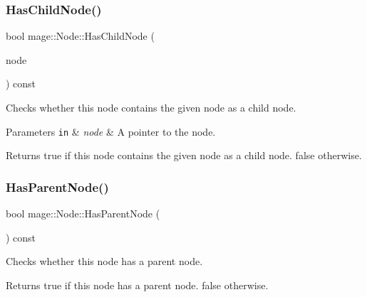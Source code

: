 \subsubsection{\texorpdfstring{Has\+Child\+Node()}{HasChildNode()}}
{\footnotesize\ttfamily bool mage\+::\+Node\+::\+Has\+Child\+Node (\begin{DoxyParamCaption}\item[{\hyperlink{namespacemage_a1e01ae66713838a7a67d30e44c67703e}{Shared\+Ptr}$<$ const \hyperlink{classmage_1_1_node}{Node} $>$}]{node }\end{DoxyParamCaption}) const}

Checks whether this node contains the given node as a child node.


\begin{DoxyParams}[1]{Parameters}
\mbox{\tt in}  & {\em node} & A pointer to the node. \\
\hline
\end{DoxyParams}
\begin{DoxyReturn}{Returns}
{\ttfamily true} if this node contains the given node as a child node. {\ttfamily false} otherwise. 
\end{DoxyReturn}
\hypertarget{classmage_1_1_node_acc47eb0f2eaa60e71fd945e79b4f622d}{}\label{classmage_1_1_node_acc47eb0f2eaa60e71fd945e79b4f622d} 
\subsubsection{\texorpdfstring{Has\+Parent\+Node()}{HasParentNode()}}
{\footnotesize\ttfamily bool mage\+::\+Node\+::\+Has\+Parent\+Node (\begin{DoxyParamCaption}{ }\end{DoxyParamCaption}) const\hspace{0.3cm}{\ttfamily [noexcept]}}

Checks whether this node has a parent node.

\begin{DoxyReturn}{Returns}
{\ttfamily true} if this node has a parent node. {\ttfamily false} otherwise. 
\end{DoxyReturn}
\hypertarget{classmage_1_1_node_a6fce6afdcfdde0e5dff5b219cee4f372}{}\label{classmage_1_1_node_a6fce6afdcfdde0e5dff5b219cee4f372} 
